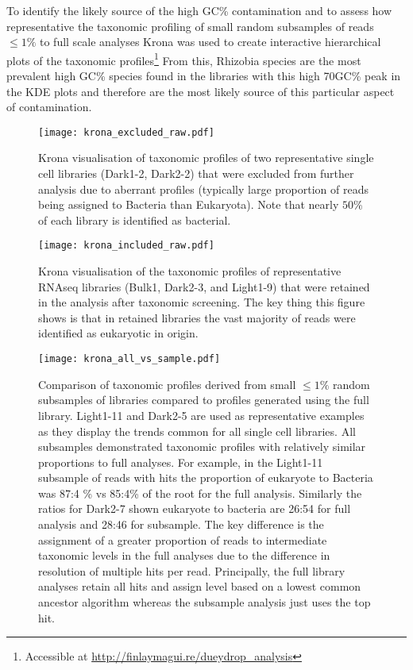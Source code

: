To identify the likely source of the high GC\% contamination 
and to assess how representative the taxonomic profiling of small random
subsamples of reads \(\leq1\%\) to full scale analyses Krona was used to 
create interactive hierarchical plots of the taxonomic profiles\footnote{
Accessible at \url{http://finlaymagui.re/dueydrop_analysis}} 
From this, Rhizobia species are the most prevalent high GC\% species found in the libraries
with this high 70GC\% peak in the KDE plots and therefore are the most likely source
of this particular aspect of contamination. 

\begin{figure}[h!]
    \texttt{[image: krona\_excluded\_raw.pdf]}
    \caption[Visualisation of taxonomically excluded libraries]{Krona visualisation of taxonomic profiles of two representative
        single cell libraries (Dark1-2, Dark2-2) that were excluded from further analysis due 
    to aberrant profiles (typically large proportion of reads being assigned
    to Bacteria than Eukaryota). Note that nearly \(50\%\) of each library is identified as bacterial.}
    \label{fig:krona_excluded}
\end{figure}

\begin{figure}[h!]
    \texttt{[image: krona\_included\_raw.pdf]}
    \caption[Visualisation of taxonomically included libraries]{
    Krona visualisation of the taxonomic profiles of representative 
    RNAseq libraries (Bulk1, Dark2-3, and Light1-9) that were retained 
    in the analysis after taxonomic screening.  The key thing this figure
    shows is that in retained libraries the vast majority of reads were 
    identified as eukaryotic in origin.
    }
    \label{fig:krona_included}
\end{figure}


\begin{figure}[hp]
    \texttt{[image: krona\_all\_vs\_sample.pdf]}
    \caption[Comparison of Subsample to Whole Library Profiles]{Comparison of taxonomic profiles derived from small \(\leq1\%\)
        random subsamples of libraries compared to profiles generated using the
        full library.  Light1-11 and Dark2-5 are used as representative examples
        as they display the trends common for all single cell libraries. 
        All subsamples demonstrated taxonomic profiles with relatively similar
        proportions to full analyses.  For example, in the Light1-11 subsample
        of reads with hits the proportion of eukaryote to Bacteria was 87:4 
        \% vs 85:4\% of the root for the full analysis. Similarly the ratios
        for Dark2-7 shown eukaryote to bacteria are 26:54 for full analysis
        and 28:46 for subsample. 
        The key difference is the assignment of a greater proportion of reads to 
        intermediate taxonomic levels in the full analyses due to the difference in 
        resolution of multiple hits per read.  Principally, the full library analyses
        retain all hits and assign level based on a lowest common ancestor algorithm
        whereas the subsample analysis just uses the top hit.
    }
    \label{fig:krona_sample_vs_full}
\end{figure}

